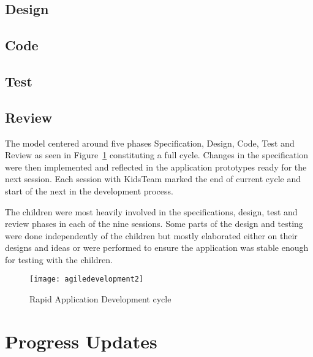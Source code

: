 \subsection{Design}

\subsection{Code}

\subsection{Test}

\subsection{Review}


The model centered around five phases Specification, Design, Code, Test and Review as seen in Figure~\ref{fig:agiledesignprocess} constituting a full cycle. Changes in the specification were then implemented and reflected in the application prototypes ready for the next session. Each session with KidsTeam marked the end of current cycle and start of the next in the development process. \cite{0136061699}\cite{Ruparelia:2010:SDL:1764810.1764814}

The children were most heavily involved in the specifications, design, test and review phases in each of the nine sessions. Some parts of the design and testing were done independently of the children but mostly elaborated either on their designs and ideas or were performed to ensure the application was stable enough for testing with the children.  

\begin{figure}
\centering
\texttt{[image: agiledevelopment2]}
\caption{Rapid Application Development cycle }
\label{fig:agiledesignprocess}
\end{figure}


\section{Progress Updates}
